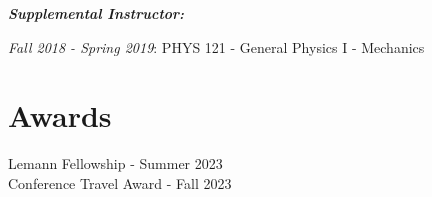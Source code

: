 \documentclass[letterpaper,11pt]{article}
\begin{document}
\begin{adjustwidth}{6mm}{0mm}
  \textbf{\textit{Supplemental Instructor:}}
\end{adjustwidth}

\begin{adjustwidth}{9mm}{0mm}
  \textit{Fall 2018 - Spring 2019}: PHYS 121 - General Physics I - Mechanics
\end{adjustwidth}

\section{Awards}

\begin{adjustwidth}{6mm}{0mm}
  Lemann Fellowship - Summer 2023
  \\
  Conference Travel Award - Fall 2023
\end{adjustwidth}
\end{document}
